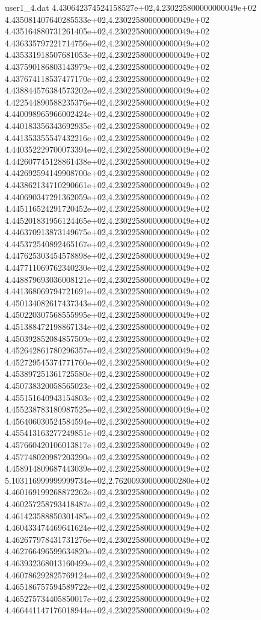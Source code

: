 \begin{filecontents}{user1_4.dat}
4.430642374524158527e+02,4.230225800000000049e+02
4.435081407640285533e+02,4.230225800000000049e+02
4.435164880731261405e+02,4.230225800000000049e+02
4.436335797221714756e+02,4.230225800000000049e+02
4.435331918507681053e+02,4.230225800000000049e+02
4.437590186803143979e+02,4.230225800000000049e+02
4.437674118537477170e+02,4.230225800000000049e+02
4.438844576384573202e+02,4.230225800000000049e+02
4.422544890588235376e+02,4.230225800000000049e+02
4.440098965966002424e+02,4.230225800000000049e+02
4.440183356343692935e+02,4.230225800000000049e+02
4.441353355547432216e+02,4.230225800000000049e+02
4.440352229700073394e+02,4.230225800000000049e+02
4.442607745128861438e+02,4.230225800000000049e+02
4.442692594149908700e+02,4.230225800000000049e+02
4.443862134710290661e+02,4.230225800000000049e+02
4.440690347291362059e+02,4.230225800000000049e+02
4.445116524291720452e+02,4.230225800000000049e+02
4.445201831956124465e+02,4.230225800000000049e+02
4.446370913873149675e+02,4.230225800000000049e+02
4.445372540892465167e+02,4.230225800000000049e+02
4.447625303454578898e+02,4.230225800000000049e+02
4.447711069762340230e+02,4.230225800000000049e+02
4.448879693036008121e+02,4.230225800000000049e+02
4.441368069794721691e+02,4.230225800000000049e+02
4.450134082617437343e+02,4.230225800000000049e+02
4.450220307568555995e+02,4.230225800000000049e+02
4.451388472198867134e+02,4.230225800000000049e+02
4.450392852084857509e+02,4.230225800000000049e+02
4.452642861780296357e+02,4.230225800000000049e+02
4.452729545374771760e+02,4.230225800000000049e+02
4.453897251361725580e+02,4.230225800000000049e+02
4.450738320058565023e+02,4.230225800000000049e+02
4.455151640943154803e+02,4.230225800000000049e+02
4.455238783180987525e+02,4.230225800000000049e+02
4.456406030524584594e+02,4.230225800000000049e+02
4.455413163277249851e+02,4.230225800000000049e+02
4.457660420106013817e+02,4.230225800000000049e+02
4.457748020987203290e+02,4.230225800000000049e+02
4.458914809687443039e+02,4.230225800000000049e+02
5.103116999999999734e+02,2.762009300000000280e+02
4.460169199268872262e+02,4.230225800000000049e+02
4.460257258793418487e+02,4.230225800000000049e+02
4.461423588850301485e+02,4.230225800000000049e+02
4.460433474469641624e+02,4.230225800000000049e+02
4.462677978431731276e+02,4.230225800000000049e+02
4.462766496599634820e+02,4.230225800000000049e+02
4.463932368013160499e+02,4.230225800000000049e+02
4.460786292825769124e+02,4.230225800000000049e+02
4.465186757594589722e+02,4.230225800000000049e+02
4.465275734405850017e+02,4.230225800000000049e+02
4.466441147176018944e+02,4.230225800000000049e+02

\end{filecontents}
